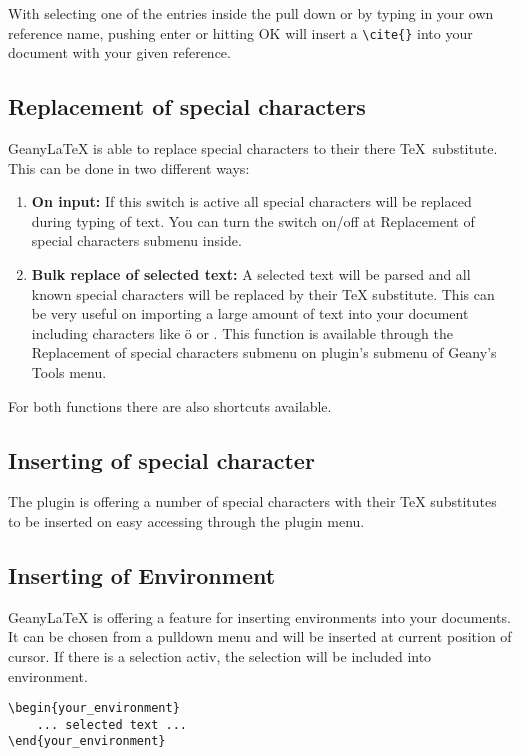 \documentclass[%
paper=a4,%
fontsize=11pt,%
twoside=false,%
DIV18,%
headsepline,%
plainheadsepline,%
footsepline,%
plainfootsepline,%
bibliography=totoc,%
listof=totoc,%
BCOR10mm,%
parskip=half,%
openany,%
]{scrartcl}
\begin{document}
With selecting one of the entries inside the pull down or by typing
in your own reference name, pushing enter or hitting OK will insert
a \texttt{\textbackslash{}cite\{\}} into your document with your
given reference.

\subsection{Replacement of special characters}
Geany\LaTeX{} is able to replace special characters to their there \TeX\
substitute. This can be done in two different ways:

\begin{enumerate}
	\item \textbf{On input:} If this switch is active all special
		  characters will be replaced during typing of text. You can
		  turn the switch on/off at Replacement of special characters
		  submenu inside.
	\item \textbf{Bulk replace of selected text:}
		  A selected text will be parsed and all known special characters
		  will be replaced by their \TeX{} substitute. This can be very useful
		  on importing a large amount of text into your document
		  including characters like ö or \frqq. This function is
		  available through the Replacement of special characters
		  submenu on plugin's submenu of Geany's Tools menu.
\end{enumerate}

For both functions there are also shortcuts available.

\subsection{Inserting of special character}
The plugin is offering a number of special characters with their \TeX{}
substitutes to be inserted on easy accessing through the plugin menu.

\subsection{Inserting of Environment}
Geany\LaTeX{} is offering a feature for inserting environments into your
documents. It can be chosen from a pulldown menu and will be inserted at
current position of cursor. If there is a selection activ, the selection
will be included into environment.

\begin{lstlisting}
\begin{your_environment}
	... selected text ...
\end{your_environment}
\end{lstlisting}
\end{document}
